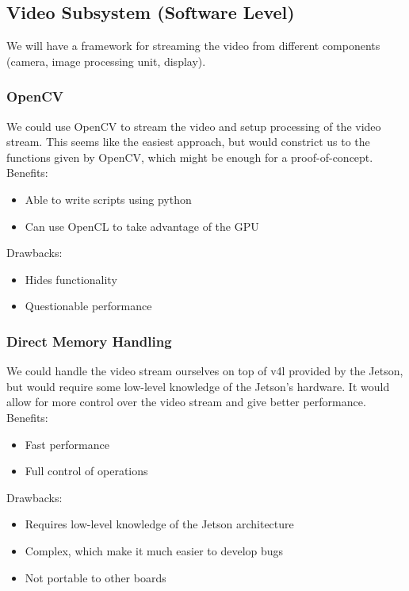\subsection{Video Subsystem (Software Level)}
We will have a framework for streaming the video from different components (camera, image processing unit, display).\\
	
	\subsubsection{OpenCV}
	We could use OpenCV to stream the video and setup processing of the video stream. This seems like the easiest approach, but would constrict us to the functions given by OpenCV, which might be enough for a proof-of-concept.\\
		
	Benefits:
	\begin{itemize}[leftmargin=2cm,labelindent=2cm]
		\item Able to write scripts using python
		\item Can use OpenCL to take advantage of the GPU
	\end{itemize}
	
	Drawbacks:
	\begin{itemize}[leftmargin=2cm,labelindent=2cm]
		\item Hides functionality
		\item Questionable performance\\
	\end{itemize}
	
	\subsubsection{Direct Memory Handling}
	We could handle the video stream ourselves on top of v4l provided by the Jetson, but would require some low-level knowledge of the Jetson's hardware. It would allow for more control over the video stream and give better performance.\\
	
	Benefits:
	\begin{itemize}[leftmargin=2cm,labelindent=2cm]
		\item Fast performance
		\item Full control of operations
	\end{itemize}
	
	Drawbacks:
	\begin{itemize}[leftmargin=2cm,labelindent=2cm]
		\item Requires low-level knowledge of the Jetson architecture
		\item Complex, which make it much easier to develop bugs
		\item Not portable to other boards\\
	\end{itemize}
	
